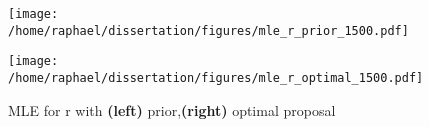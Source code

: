 \documentclass{article}
\begin{document}
	\begin{figure}[htb]
		\centering
		\begin{minipage}{0.9\textwidth}
			\centering
			\texttt{[image: /home/raphael/dissertation/figures/mle\_r\_prior\_1500.pdf]}
		\end{minipage}
		\begin{minipage}{.9\textwidth}
			\centering
			\texttt{[image: /home/raphael/dissertation/figures/mle\_r\_optimal\_1500.pdf]}
		\end{minipage}
		\caption{MLE for r with \textbf{(left)} prior,\textbf{(right)} optimal proposal}
		\label{fig:comparison1500}
	\end{figure}
	
\end{document}
